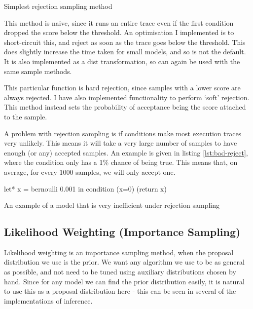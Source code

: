 \begin{listing}[!htb]
	\centering
	\caption{Simplest rejection sampling method}
	\label{lst:rej}
\end{listing}
	
This method is naive, since it runs an entire trace even if the first condition dropped the score below the threshold. An optimisation I implemented is to short-circuit this, and reject as soon as the trace goes below the threshold. This does slightly increase the time taken for small models, and so is not the default. It is also implemented as a dist transformation, so can again be used with the same sample methods.
	
This particular function is hard rejection, since samples with a lower score are always rejected. I have also implemented functionality to perform `soft' rejection. This method instead sets the probability of acceptance being the score attached to the sample.
	
A problem with rejection sampling is if conditions make most execution traces very unlikely. This means it will take a very large number of samples to have enough (or any) accepted samples. An example is given in listing \ref{lst:bad-reject}, where the condition only has a 1\% chance of being true. This means that, on average, for every 1000 samples, we will only accept one.
	
\begin{listing}[!htb]
	\centering
	\begin{ocamlcode-in}
let* x = bernoulli 0.001 in
condition (x=0)
(return x)
	\end{ocamlcode-in}
		
	\caption{An example of a model that is very inefficient under rejection sampling}
	\label{lst:bad-reject}
\end{listing}
% 
\subsection{Likelihood Weighting (Importance Sampling)} \label{sec:likelihood-wighting}
		
Likelihood weighting is an importance sampling method, when the proposal distribution we use is the prior. We want any algorithm we use to be as general as possible, and not need to be tuned using auxiliary distributions chosen by hand. Since for any model we can find the prior distribution easily, it is natural to use this as a proposal distribution here - this can be seen in several of the implementations of inference. 
	
